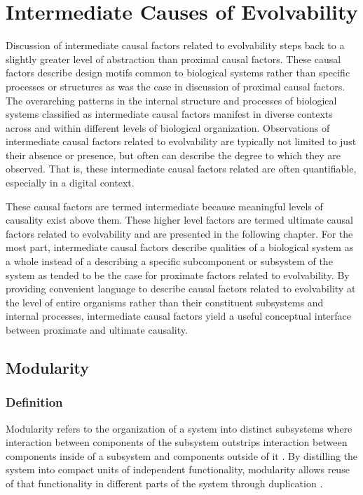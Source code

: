 \chapter{Intermediate Causes of Evolvability} \label{sec:intermediate}

Discussion of intermediate causal factors related to evolvability steps back to a slightly greater level of abstraction than proximal causal factors.
These causal factors describe design motifs common to biological systems rather than specific processes or structures as was the case in discussion of proximal causal factors.
The overarching patterns in the internal structure and processes of biological systems classified as intermediate causal factors manifest in diverse contexts across and within different levels of biological organization.
Observations of intermediate causal factors related to evolvability are typically not limited to just their absence or presence, but often can describe the degree to which they are observed.
That is, these intermediate causal factors related are often quantifiable, especially in a digital context.

These causal factors are termed intermediate because meaningful levels of causality exist above them.
These higher level factors are termed ultimate causal factors related to evolvability and are presented in the following chapter.
For the most part, intermediate causal factors describe qualities of a biological system as a whole instead of a describing a specific subcomponent or subsystem of the system as tended to be the case for proximate factors related to evolvability.
By providing convenient language to describe causal factors related to evolvability at the level of entire organisms rather than their constituent subsystems and internal processes, intermediate causal factors yield a useful conceptual interface between proximate and ultimate causality.

\section{Modularity} \label{sec:modularity}
\subsection{Definition}
Modularity refers to the organization of a system into distinct subsystems where interaction between components of the subsystem outstrips interaction between components inside of a subsystem and components outside of it \cite[p 207]{Downing2015IntelligenceSystems}.
By distilling the system into compact units of independent functionality, modularity allows reuse of that functionality in different parts of the system through duplication \cite{Reisinger2005TowardsEvolvability}.

